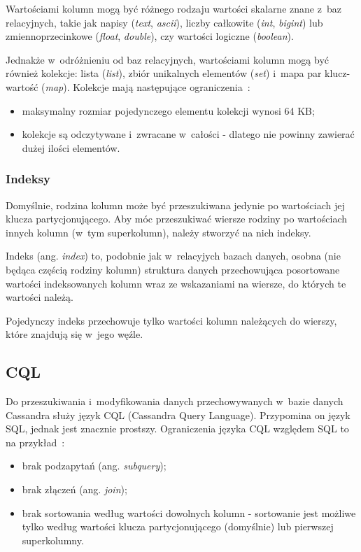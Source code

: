 Wartościami kolumn mogą być różnego rodzaju wartości skalarne znane z~baz relacyjnych, takie jak napisy (\emph{text}, \emph{ascii}), liczby całkowite (\emph{int}, \emph{bigint}) lub zmiennoprzecinkowe (\emph{float}, \emph{double}), czy wartości logiczne (\emph{boolean}).

Jednakże w~odróżnieniu od baz relacyjnych, wartościami kolumn mogą być również kolekcje: lista (\emph{list}), zbiór unikalnych elementów (\emph{set}) i~mapa par klucz-wartość (\emph{map}).
Kolekcje mają następujące ograniczenia~\cite{cassandra:collections}:

\begin{itemize}
 \item maksymalny rozmiar pojedynczego elementu kolekcji wynosi 64 KB;
 \item kolekcje są odczytywane i~zwracane w~całości - dlatego nie powinny zawierać dużej ilości elementów.
\end{itemize}

\subsubsection{Indeksy}

Domyślnie, rodzina kolumn może być przeszukiwana jedynie po wartościach jej klucza partycjonującego.
Aby móc przeszukiwać wiersze rodziny po wartościach innych kolumn (w~tym superkolumn), należy stworzyć na nich indeksy.

Indeks (ang. \emph{index}) to, podobnie jak w~relacyjych bazach danych, osobna (nie będąca częścią rodziny kolumn) struktura danych przechowująca posortowane wartości indeksowanych kolumn wraz ze wskazaniami na wiersze, do których te wartości należą.

Pojedynczy indeks przechowuje tylko wartości kolumn należących do wierszy, które znajdują się w~jego węźle.


\subsection{CQL}

Do przeszukiwania i~modyfikowania danych przechowywanych w~bazie danych Cassandra służy język CQL (Cassandra Query Language).
Przypomina on język SQL, jednak jest znacznie prostszy.
Ograniczenia języka CQL względem SQL to na przykład~\cite{cassandra_3_0}:

\begin{itemize}
 \item brak podzapytań (ang. \emph{subquery});
 \item brak złączeń (ang. \emph{join});
 \item brak sortowania według wartości dowolnych kolumn - sortowanie jest możliwe tylko według wartości klucza partycjonującego (domyślnie) lub pierwszej superkolumny.
\end{itemize}

